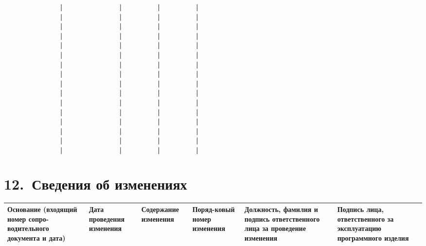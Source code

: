 \documentclass[11pt,a4paper]{article}
\begin{document}
\begin{center}
\begin{BVerbatim}
                │                │          │          │
                │                │          │          │
                │                │          │          │
                │                │          │          │
                │                │          │          │
                │                │          │          │
                │                │          │          │
                │                │          │          │
                │                │          │          │
                │                │          │          │
                │                │          │          │
                │                │          │          │
                │                │          │          │
                │                │          │          │
                │                │          │          │
                │                │          │          │
\end{BVerbatim}
\end{center}

\section*{12.~Сведения об изменениях}
\begin{center}\small\begin{tabularx}{\linewidth}{|>{\raggedright\arraybackslash\hsize=1.727\hsize}X|>{\raggedright\arraybackslash\hsize=0.727\hsize}X|>{\raggedright\arraybackslash\hsize=0.727\hsize}X|>{\raggedright\arraybackslash\hsize=0.818\hsize}X|>{\raggedright\arraybackslash\hsize=1.091\hsize}X|>{\raggedright\arraybackslash\hsize=0.909\hsize}X|}\hline
\small\bfseries\hspace{0pt}Основание (входящий номер сопро-водительного документа и дата) & \small\bfseries\hspace{0pt}Дата проведения изменения & \small\bfseries\hspace{0pt}Содержание изменения & \small\bfseries\hspace{0pt}Поряд-ковый номер изменения & \small\bfseries\hspace{0pt}Должность, фамилия и подпись ответственного лица за проведение изменения & \small\bfseries\hspace{0pt}Подпись лица, ответственного за эксплуатацию программного изделия \\ \hline
\end{tabularx}\end{center}
\end{document}
